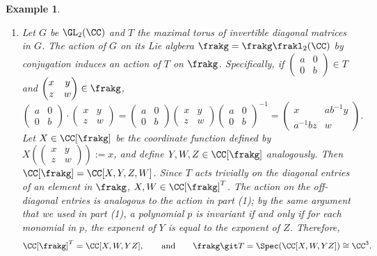 \documentclass[12pt]{amsart}
\theoremstyle{plain}
\newtheorem{example}[theorem]{Example}
\begin{document}
\begin{example}
\begin{enumerate}
\item
Let $G$ be $\GL_2(\CC)$ and $T$ the maximal torus of invertible diagonal matrices in $G$.
The action of $G$ on its Lie algbera $\frakg = \frakg \frakl_2(\CC)$ by conjugation induces an action of $T$ on $\frakg$.
Specifically, if $\begin{pmatrix} a & 0 \\ 0 & b \end{pmatrix} \in T$ and $\begin{pmatrix} x & y \\ z & w \end{pmatrix} \in \frakg$, 
$$\begin{pmatrix} a & 0 \\ 0 & b \end{pmatrix} \cdot \begin{pmatrix} x & y \\ z & w \end{pmatrix} 
= \begin{pmatrix} a & 0 \\ 0 & b \end{pmatrix} \begin{pmatrix} x & y \\ z & w \end{pmatrix} \begin{pmatrix} a & 0 \\ 0 & b \end{pmatrix}^{-1}
= \begin{pmatrix} x & a b^{-1} y \\ a^{-1} b z & w \end{pmatrix}.$$
Let $X \in \CC[\frakg]$ be the coordinate function defined by $X \left(\begin{pmatrix} x & y \\ z & w \end{pmatrix}  \right) := x$, and define $Y, W, Z \in \CC[\frakg]$ analogously.
Then $\CC[\frakg] = \CC[X, Y, Z, W]$.
Since $T$ acts trivially on the diagonal entries of an element in $\frakg$, $X, W \in \CC[\frakg]^T$.
The action on the off-diagonal entries is analogous to the action in part (1);
by the same argument that we used in part (1), a polynomial $p$ is invariant if and only if for each monomial in $p$, the exponent of $Y$ is equal to the exponent of $Z$.
Therefore,
$$\CC[\frakg]^T = \CC[X, W, YZ], \qquad \text{and} \qquad \frakg \git T = \Spec(\CC[X, W, YZ]) \cong \CC^3.$$


\end{enumerate}
\end{example}
\end{document}
